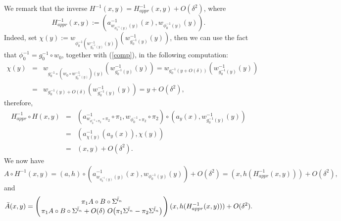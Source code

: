 \noindent
 We remark that the inverse $H^{-1}(x,y)=H^{-1}_{appr}(x,y)+O(\delta^2)$, where
$$H^{-1}_{appr}(x,y):=\left(a^{-1}_{w_{\phi_0^{-1}(y)}(y)}(x), w_{\phi_0^{-1}(y)}(y) \right).$$
Indeed, set  $\chi(y):=w_{\phi_0^{-1}\left(w^{-1}_{g_0^{-1}(y)}(y) \right)} \left(w^{-1}_{g_0^{-1}(y)}(y)\right)$, then we can use the fact that $\phi_0^{-1}=g_0^{-1} \circ w_0$, together with (\ref{comp}),  in the following computation:
\begin{eqnarray}
\nonumber \chi(y)&=&w_{g_0^{-1} \circ \left(w_0 \circ w^{-1}_{g_0^{-1}(y)}\right)(y)} \left(w^{-1}_{g_0^{-1}(y)}(y)\right)=w_{g_0^{-1}\left(y+O(\delta)\right)} \left(w^{-1}_{g_0^{-1}(y)}(y)\right) \\
\nonumber &=&w_{g_0^{-1}(y)+O(\delta)} \left(w^{-1}_{g_0^{-1}(y)}(y)\right)=y+O(\delta^2),
\end{eqnarray}
therefore,
\begin{eqnarray}
\nonumber H_{appr}^{-1} \circ H(x,y)&=& \left(a^{-1}_{w_{\phi_0^{-1} \circ \pi_2} \circ \pi_2 } \circ \pi_1, w_{\phi_0^{-1} \circ \pi_2} \circ \pi_2 \right) \circ (a_y(x),w_{g_0^{-1}(y)}^{-1}(y)) \\
\nonumber &=&\left(a^{-1}_{\chi(y)}(a_y(x)), \chi(y)\right) \\
\nonumber &=&(x,y)+O(\delta^2).
\end{eqnarray}
We now have
$$A \circ H^{-1}(x,y)=(a,h) \circ \left(a^{-1}_{w_{\phi_0^{-1}(y)}(y)}(x), w_{\phi_0^{-1}(y)}(y) \right) +O(\delta^2)=(x,h(H^{-1}_{appr}(x,y)))+O(\delta^2),$$
\noindent
and
$$ \bar{A}(x,y)= \left( { \pi_1 A \circ B \circ \Sigma^{\bar l_n} \atop  \pi_1 A \circ B \circ \Sigma^{\bar l_n} + O(\delta) \ O\!\left({\pi_1 \Sigma^{\bar l_n}} -{\pi_2 \Sigma^{\bar l_n} }\right) } \right)(x,h(H^{-1}_{appr}(x,y)))+O(\delta^2).$$




